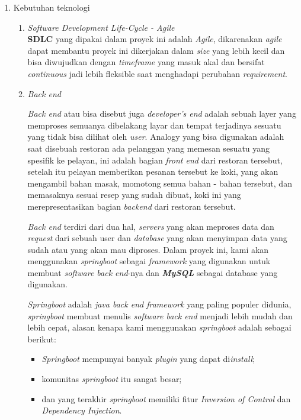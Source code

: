 \documentclass[a4paper]{article}
\begin{document}
\begin{enumerate}[label=\alph*. ]

    \item Kebutuhan teknologi

          \begin{enumerate}
              \item \textit{Software Development Life-Cycle - Agile}\\
                    \textbf{SDLC} yang dipakai dalam proyek ini adalah \textit{Agile}, dikarenakan \textit{agile} dapat membantu proyek ini dikerjakan dalam \textit{size} yang lebih kecil dan bisa diwujudkan dengan \textit{timeframe} yang masuk akal dan bersifat \textit{continuous} jadi lebih fleksible saat menghadapi perubahan \textit{requirement}\autocite{atlassian-agile}.

              \item \textit{Back end}

                    \textit{Back end} atau bisa disebut juga \textit{developer's end} adalah sebuah layer yang memproses semuanya dibelakang layar dan tempat terjadinya sesuatu yang tidak bisa dilihat oleh \textit{user}\autocite{letsgodojo-frontend-backend}. Analogy yang bisa digunakan adalah saat disebuah restoran ada pelanggan yang memesan sesuatu yang spesifik ke pelayan, ini adalah bagian \textit{front end} dari restoran tersebut, setelah itu pelayan memberikan pesanan tersebut ke koki, yang akan mengambil bahan masak, momotong semua bahan - bahan tersebut, dan memasaknya sesuai resep yang sudah dibuat, koki ini yang merepresentasikan bagian \textit{backend} dari restoran tersebut\autocite{codecademy-backend}.

                    \textit{Back end} terdiri dari dua hal, \textit{servers} yang akan meproses data dan \textit{request} dari sebuah user dan \textit{database} yang akan menyimpan data yang sudah atau yang akan mau diproses\autocite{codecademy-backend}. Dalam proyek ini, kami akan menggunakan \textit{springboot} sebagai \textit{framework} yang digunakan untuk membuat \textit{software back end}-nya dan \textit{\textbf{MySQL}} sebagai database yang digunakan.

                    \textit{Springboot} adalah \textit{java back end framework} yang paling populer didunia, \textit{springboot} membuat menulis \textit{software back end} menjadi lebih mudah dan lebih cepat\autocite{spring-framework}, alasan kenapa kami menggunakan \textit{springboot} adalah sebagai berikut:
                    \begin{itemize}
                        \item \textit{Springboot} mempunyai banyak \textit{plugin} yang dapat di\textit{install};
                        \item komunitas \textit{springboot} itu sangat besar;
                        \item dan yang terakhir \textit{springboot} memiliki fitur \textit{Inversion of Control} dan \textit{Dependency Injection}.
                    \end{itemize}


\end{enumerate}
\end{enumerate}
\end{document}
